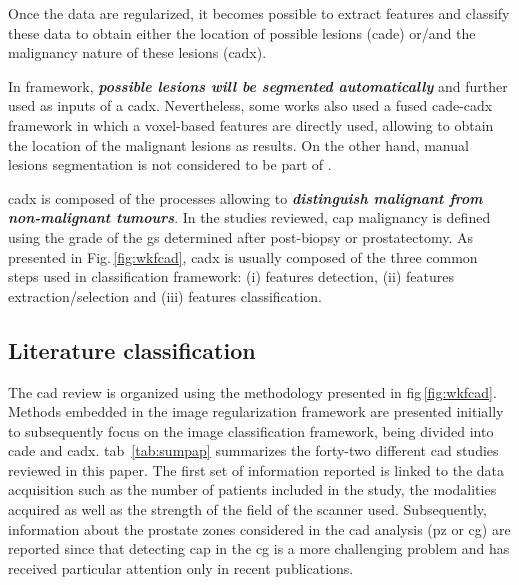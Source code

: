 Once the data are regularized, it becomes possible to extract features and classify these data to obtain either the location of possible lesions (\ac{cade}) or/and the malignancy nature of these lesions (\ac{cadx}).

In  framework, \textbf{\textit{possible lesions will be segmented automatically}} and further used as inputs of a \ac{cadx}. Nevertheless, some works also used a fused \ac{cade}-\ac{cadx} framework in which a voxel-based features are directly used, allowing to obtain the location of the malignant lesions as results. On the other hand, manual lesions segmentation is not considered to be part of .

\Ac{cadx} is composed of the processes allowing to \textbf{\textit{distinguish malignant from non-malignant tumours}}. In the studies reviewed, \ac{cap} malignancy is defined using the grade of the \ac{gs} determined after post-biopsy or prostatectomy. As presented in Fig.\,\ref{fig:wkfcad}, \ac{cadx} is usually composed of the three common steps used in classification framework: (i) features detection, (ii) features extraction/selection and (iii) features classification.

\subsection{Literature classification}

The \ac{cad} review is organized using the methodology presented in \acs{fig}\,\ref{fig:wkfcad}. Methods embedded in the image regularization framework are presented initially to subsequently focus on the image classification framework, being divided into \ac{cade} and \ac{cadx}. \Acl{tab}~\ref{tab:sumpap} summarizes the forty-two different \ac{cad} studies reviewed in this paper. The first set of information reported is linked to the data acquisition such as the number of patients included in the study, the modalities acquired as well as the strength of the field of the scanner used. Subsequently, information about the prostate zones considered in the \ac{cad} analysis (\ac{pz} or \ac{cg}) are reported since that detecting \ac{cap} in the \ac{cg} is a more challenging problem and has received particular attention only in recent publications.

